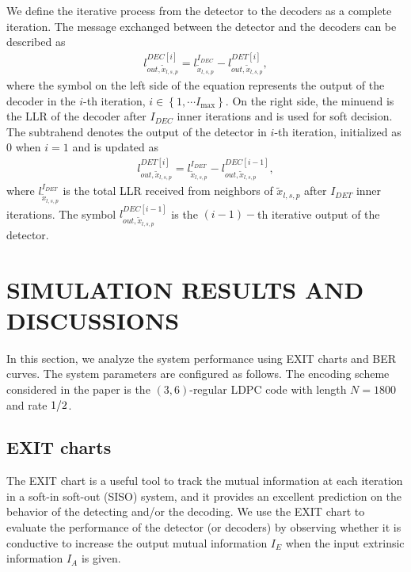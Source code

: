 \documentclass[conference]{IEEEtran}
\begin{document}
We define the iterative process from the detector to the decoders as a complete iteration. The message exchanged between the detector and the decoders can be described as
\begin{equation}
\begin{aligned}
l_{out,{{\tilde {x}}_{l,s,p}}}^{DEC[i]} = l_{{{\tilde {x}}_{l,s,p}}}^{{I_{DEC}}} - l_{out,{{\tilde {x}}_{l,s,p}}}^{DET[i]}\label{17},
\end{aligned}
\end{equation}
where the symbol on the left side of the equation represents the output of the decoder in the $i$-th iteration, $i \in \left\{ {1, \cdots {I_{\max }}} \right\}$. On the right side, the minuend is the LLR of the decoder after ${{I_{DEC}}}$ inner iterations and is used for soft decision. The subtrahend denotes the output of the detector in $i$-th iteration, initialized as $0$ when $i=1$ and is updated as
\begin{equation}
\begin{aligned}
l_{out,{{\tilde {x}}_{l,s,p}}}^{DET[i]} = l_{{{\tilde {x}}_{l,s,p}}}^{{I_{DET}}} - l_{out,{{\tilde {x}}_{l,s,p}}}^{DEC[i - 1]}\label{18},
\end{aligned}
\end{equation}
where $l_{{{\tilde {x}}_{l,s,p}}}^{{I_{DET}}}$ is the total LLR received from neighbors of ${{{\tilde {x}}_{l,s,p}}}$ after ${{I_{DET}}}$ inner iterations. The symbol $l_{out,{{\tilde {x}}_{l,s,p}}}^{DEC[i - 1]}$ is the $(i - 1)-$th iterative output of the detector.

\section{SIMULATION RESULTS AND DISCUSSIONS}

In this section, we analyze the system performance using EXIT charts and BER curves. The system parameters are configured as follows. The encoding scheme considered in the paper is the $(3,6)$-regular LDPC code with length $N=1800$ and rate ${1 \mathord{\left/
 {\vphantom {1 2}} \right.
 \kern-\nulldelimiterspace} 2}$.
\subsection{EXIT charts}
The EXIT chart is a useful tool to track the mutual information at each iteration in a soft-in soft-out (SISO) system, and it provides an excellent prediction on the behavior of the detecting and/or the decoding. We use the EXIT chart to evaluate the performance of the detector (or decoders) by observing whether it is conductive to increase the output mutual information ${I_E}$ when the input extrinsic information ${I_A}$ is given.
\end{document}
